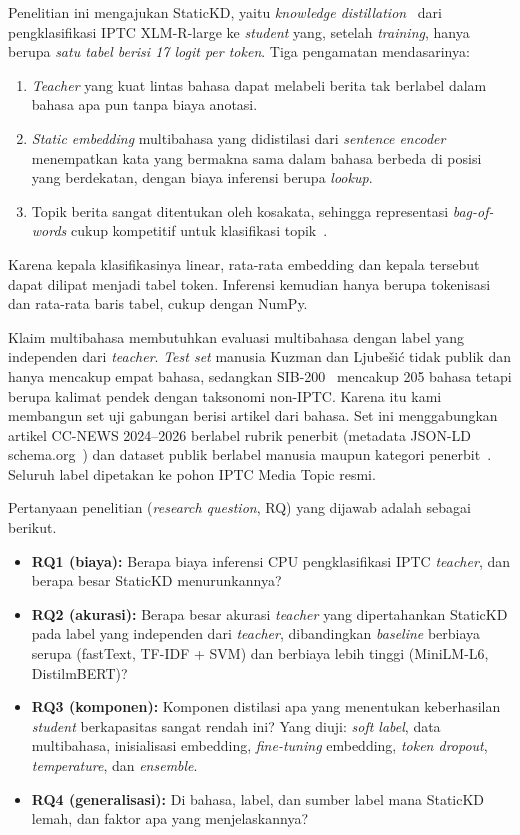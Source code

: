 \documentclass[journal]{IEEEtran}
\newcommand{\eng}[1]{\textit{#1}}   %
\begin{document}
Penelitian ini mengajukan StaticKD, yaitu \eng{knowledge distillation}~\cite{hinton2015distilling,bucilua2006model} dari pengklasifikasi IPTC XLM-R-large ke \eng{student} yang, setelah \eng{training}, hanya berupa \emph{satu tabel berisi 17 logit per token}. Tiga pengamatan mendasarinya:
\begin{enumerate}
  \item \eng{Teacher} yang kuat lintas bahasa dapat melabeli berita tak berlabel dalam bahasa apa pun tanpa biaya anotasi.
  \item \eng{Static embedding} multibahasa yang didistilasi dari \eng{sentence encoder}~\cite{tulkens2024model2vec,wada2025static,chen2024bgem3} menempatkan kata yang bermakna sama dalam bahasa berbeda di posisi yang berdekatan, dengan biaya inferensi berupa \eng{lookup}.
  \item Topik berita sangat ditentukan oleh kosakata, sehingga representasi \eng{bag-of-words} cukup kompetitif untuk klasifikasi topik~\cite{galke2022bow,iyyer2015dan}.
\end{enumerate}
Karena kepala klasifikasinya linear, rata-rata embedding dan kepala tersebut dapat dilipat menjadi tabel token. Inferensi kemudian hanya berupa tokenisasi dan rata-rata baris tabel, cukup dengan NumPy.

Klaim multibahasa membutuhkan evaluasi multibahasa dengan label yang independen dari \eng{teacher}. \eng{Test set} manusia Kuzman dan Ljube\v{s}i\'c tidak publik dan hanya mencakup empat bahasa, sedangkan SIB-200~\cite{adelani2024sib200} mencakup 205 bahasa tetapi berupa kalimat pendek dengan taksonomi non-IPTC. Karena itu kami membangun set uji gabungan berisi  artikel dari  bahasa. Set ini menggabungkan artikel CC-NEWS 2024--2026 berlabel rubrik penerbit (metadata JSON-LD schema.org~\cite{guha2016schema}) dan dataset publik berlabel manusia maupun kategori penerbit~\cite{adelani2023masakhanews,petukhova2023mnds,mirashi2023indicnews,hossain2025banglanews}. Seluruh label dipetakan ke pohon IPTC Media Topic resmi.

Pertanyaan penelitian (\eng{research question}, RQ) yang dijawab adalah sebagai berikut.
\begin{itemize}
  \item \textbf{RQ1 (biaya):} Berapa biaya inferensi CPU pengklasifikasi IPTC \eng{teacher}, dan berapa besar StaticKD menurunkannya?
  \item \textbf{RQ2 (akurasi):} Berapa besar akurasi \eng{teacher} yang dipertahankan StaticKD pada label yang independen dari \eng{teacher}, dibandingkan \eng{baseline} berbiaya serupa (fastText, TF-IDF + SVM) dan berbiaya lebih tinggi (MiniLM-L6, DistilmBERT)?
  \item \textbf{RQ3 (komponen):} Komponen distilasi apa yang menentukan keberhasilan \eng{student} berkapasitas sangat rendah ini? Yang diuji: \eng{soft label}, data multibahasa, inisialisasi embedding, \eng{fine-tuning} embedding, \eng{token dropout}, \eng{temperature}, dan \eng{ensemble}.
  \item \textbf{RQ4 (generalisasi):} Di bahasa, label, dan sumber label mana StaticKD lemah, dan faktor apa yang menjelaskannya?
\end{itemize}
\end{document}
